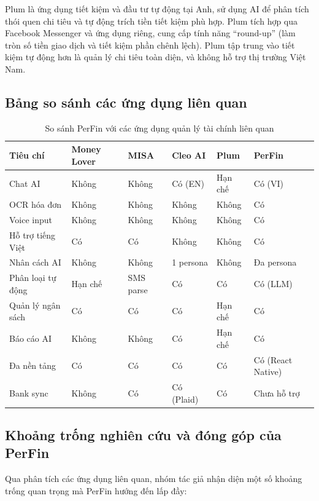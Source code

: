 Plum là ứng dụng tiết kiệm và đầu tư tự động tại Anh, sử dụng AI để phân tích thói quen chi tiêu và tự động trích tiền tiết kiệm phù hợp. Plum tích hợp qua Facebook Messenger và ứng dụng riêng, cung cấp tính năng ``round-up'' (làm tròn số tiền giao dịch và tiết kiệm phần chênh lệch). Plum tập trung vào tiết kiệm tự động hơn là quản lý chi tiêu toàn diện, và không hỗ trợ thị trường Việt Nam.

\subsection{Bảng so sánh các ứng dụng liên quan}
\label{subsec:comparison_table}

\begin{table}[h!]
\centering
\caption{So sánh PerFin với các ứng dụng quản lý tài chính liên quan}
\label{tab:app_comparison}
\begin{tabularx}{\textwidth}{|l|X|X|X|X|X|}
\hline
\textbf{Tiêu chí} & \textbf{Money Lover} & \textbf{MISA} & \textbf{Cleo AI} & \textbf{Plum} & \textbf{PerFin} \\ \hline
Chat AI & Không & Không & Có (EN) & Hạn chế & Có (VI) \\ \hline
OCR hóa đơn & Không & Không & Không & Không & Có \\ \hline
Voice input & Không & Không & Không & Không & Có \\ \hline
Hỗ trợ tiếng Việt & Có & Có & Không & Không & Có \\ \hline
Nhân cách AI & Không & Không & 1 persona & Không & Đa persona \\ \hline
Phân loại tự động & Hạn chế & SMS parse & Có & Có & Có (LLM) \\ \hline
Quản lý ngân sách & Có & Có & Có & Hạn chế & Có \\ \hline
Báo cáo AI & Không & Không & Có & Hạn chế & Có \\ \hline
Đa nền tảng & Có & Có & Có & Có & Có (React Native) \\ \hline
Bank sync & Không & Có & Có (Plaid) & Có & Chưa hỗ trợ \\ \hline
\end{tabularx}
\end{table}

\subsection{Khoảng trống nghiên cứu và đóng góp của PerFin}
\label{subsec:research_gap}

Qua phân tích các ứng dụng liên quan, nhóm tác giả nhận diện một số khoảng trống quan trọng mà PerFin hướng đến lấp đầy:

